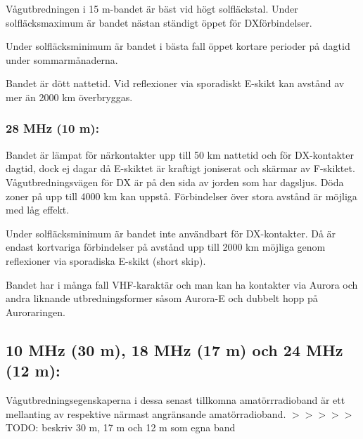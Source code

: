 Vågutbredningen i 15 m-bandet är bäst vid högt solfläckstal. Under
solfläcksmaximum är bandet nästan ständigt öppet för DXförbindelser.

Under solfläcksminimum är bandet i bästa fall öppet kortare perioder
på dagtid under sommarmånaderna.

Bandet är dött nattetid. Vid reflexioner via sporadiskt E-skikt kan
avstånd av mer än 2000 km överbryggas.

\subsubsection{28 MHz (10 m):}

Bandet är lämpat för närkontakter upp till 50 km nattetid och för
DX-kontakter dagtid, dock ej dagar då E-skiktet är kraftigt joniserat
och skärmar av F-skiktet. Vågutbredningsvägen för DX är på den sida av
jorden som har dagsljus. Döda zoner på upp till 4000 km kan
uppstå. Förbindelser över stora avstånd är möjliga med låg effekt.

Under solfläcksminimum är bandet inte användbart för DX-kontakter. Då
är endast kortvariga förbindelser på avstånd upp till 2000 km möjliga
genom reflexioner via sporadiska E-skikt (short skip).

Bandet har i många fall VHF-karaktär och man kan ha kontakter via
Aurora och andra liknande utbredningsformer såsom Aurora-E och dubbelt
hopp på Auroraringen.

\subsection{10 MHz (30 m), 18 MHz (17 m) och 24 MHz (12 m):}

Vågutbredningsegenskaperna i dessa senast tillkomna amatörrradioband
är ett mellanting av respektive närmast angränsande amatörradioband.
$>>>>>$ TODO: beskriv 30 m, 17 m och 12 m som egna band
